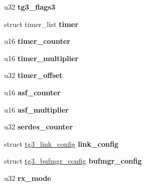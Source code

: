 \begin{DoxyCompactItemize}
\item 
\hypertarget{structtg3_a41a5066e4fa6b1cdeaf8a2a96f201158}{
u32 {\bfseries tg3\_\-flags3}}
\label{structtg3_a41a5066e4fa6b1cdeaf8a2a96f201158}

\item 
\hypertarget{structtg3_ab35b94196e0556d84c168aebbc1ba6ab}{
struct timer\_\-list {\bfseries timer}}
\label{structtg3_ab35b94196e0556d84c168aebbc1ba6ab}

\item 
\hypertarget{structtg3_a0c3549d221f06920e9527105a03b6391}{
u16 {\bfseries timer\_\-counter}}
\label{structtg3_a0c3549d221f06920e9527105a03b6391}

\item 
\hypertarget{structtg3_a3c6db14500aa5d08420d8ca3e9676542}{
u16 {\bfseries timer\_\-multiplier}}
\label{structtg3_a3c6db14500aa5d08420d8ca3e9676542}

\item 
\hypertarget{structtg3_af9719b0df9b1bd86603336df8228b543}{
u32 {\bfseries timer\_\-offset}}
\label{structtg3_af9719b0df9b1bd86603336df8228b543}

\item 
\hypertarget{structtg3_a050a2daffec2cbea770b29552c9cff38}{
u16 {\bfseries asf\_\-counter}}
\label{structtg3_a050a2daffec2cbea770b29552c9cff38}

\item 
\hypertarget{structtg3_a0136c387b5a2d1f50fc8fba0eceaf5ee}{
u16 {\bfseries asf\_\-multiplier}}
\label{structtg3_a0136c387b5a2d1f50fc8fba0eceaf5ee}

\item 
\hypertarget{structtg3_a53a3490459edcc3fad71ff46902e2fa9}{
u32 {\bfseries serdes\_\-counter}}
\label{structtg3_a53a3490459edcc3fad71ff46902e2fa9}

\item 
\hypertarget{structtg3_afc80898efa8e2661be6ec2a420c69221}{
struct \hyperlink{structtg3__link__config}{tg3\_\-link\_\-config} {\bfseries link\_\-config}}
\label{structtg3_afc80898efa8e2661be6ec2a420c69221}

\item 
\hypertarget{structtg3_a82985a36100cabcde647f5a7a4a728ee}{
struct \hyperlink{structtg3__bufmgr__config}{tg3\_\-bufmgr\_\-config} {\bfseries bufmgr\_\-config}}
\label{structtg3_a82985a36100cabcde647f5a7a4a728ee}

\item 
\hypertarget{structtg3_a2fd59fe59e228ad8ab8d70ef1cf63a28}{
u32 {\bfseries rx\_\-mode}}
\label{structtg3_a2fd59fe59e228ad8ab8d70ef1cf63a28}


\end{DoxyCompactItemize}
